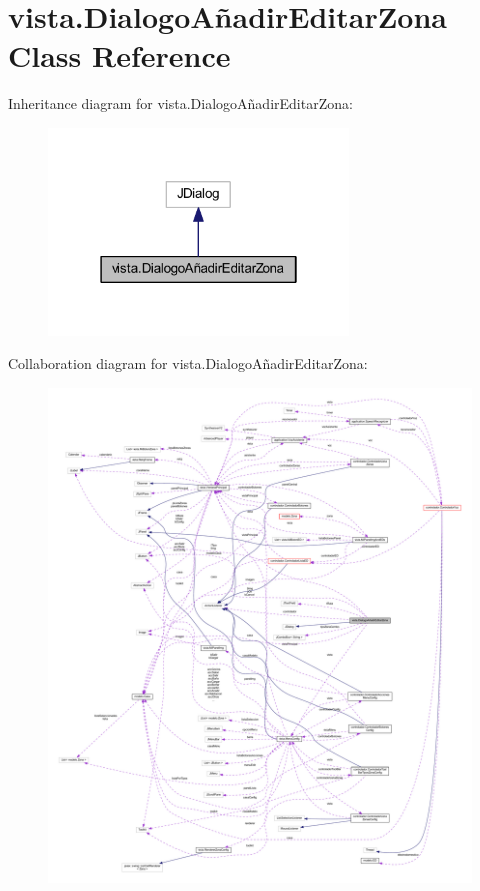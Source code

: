 \hypertarget{classvista_1_1_dialogo_a_xC3_xB1adir_editar_zona}{}\section{vista.\+Dialogo\+Añadir\+Editar\+Zona Class Reference}
\label{classvista_1_1_dialogo_a_xC3_xB1adir_editar_zona}


Inheritance diagram for vista.\+Dialogo\+Añadir\+Editar\+Zona\+:
\nopagebreak
\begin{figure}[H]
\begin{center}
\leavevmode
\includegraphics[width=226pt]{classvista_1_1_dialogo_a_xC3_xB1adir_editar_zona__inherit__graph}
\end{center}
\end{figure}


Collaboration diagram for vista.\+Dialogo\+Añadir\+Editar\+Zona\+:
\nopagebreak
\begin{figure}[H]
\begin{center}
\leavevmode
\includegraphics[width=350pt]{classvista_1_1_dialogo_a_xC3_xB1adir_editar_zona__coll__graph}
\end{center}
\end{figure}
